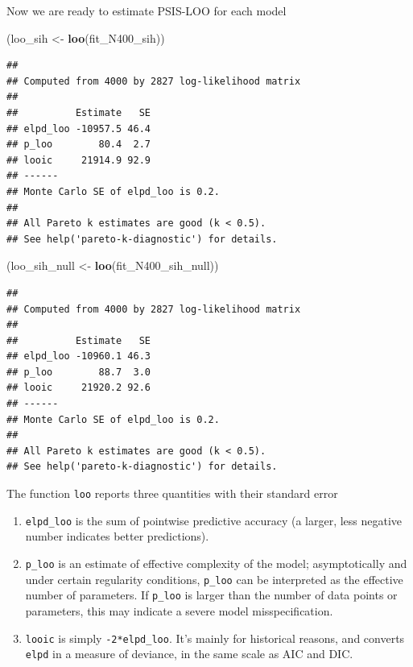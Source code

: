 \documentclass[12pt,]{krantz}
\newenvironment{Shaded}{\begin{snugshade}}{\end{snugshade}}
\newcommand{\KeywordTok}[1]{\textcolor[rgb]{0.13,0.29,0.53}{\textbf{#1}}}
\newcommand{\NormalTok}[1]{#1}
\newcommand{\StringTok}[1]{\textcolor[rgb]{0.31,0.60,0.02}{#1}}
\providecommand{\tightlist}{%
  \setlength{\itemsep}{0pt}\setlength{\parskip}{0pt}}
\theoremstyle{definition}
\theoremstyle{definition}
\theoremstyle{definition}
\theoremstyle{remark}
\begin{document}
Now we are ready to estimate PSIS-LOO for each model

\begin{Shaded}
\begin{Highlighting}[]
\NormalTok{(loo_sih <-}\StringTok{ }\KeywordTok{loo}\NormalTok{(fit_N400_sih))}
\end{Highlighting}
\end{Shaded}

\begin{verbatim}
## 
## Computed from 4000 by 2827 log-likelihood matrix
## 
##          Estimate   SE
## elpd_loo -10957.5 46.4
## p_loo        80.4  2.7
## looic     21914.9 92.9
## ------
## Monte Carlo SE of elpd_loo is 0.2.
## 
## All Pareto k estimates are good (k < 0.5).
## See help('pareto-k-diagnostic') for details.
\end{verbatim}

\begin{Shaded}
\begin{Highlighting}[]
\NormalTok{(loo_sih_null <-}\StringTok{ }\KeywordTok{loo}\NormalTok{(fit_N400_sih_null))}
\end{Highlighting}
\end{Shaded}

\begin{verbatim}
## 
## Computed from 4000 by 2827 log-likelihood matrix
## 
##          Estimate   SE
## elpd_loo -10960.1 46.3
## p_loo        88.7  3.0
## looic     21920.2 92.6
## ------
## Monte Carlo SE of elpd_loo is 0.2.
## 
## All Pareto k estimates are good (k < 0.5).
## See help('pareto-k-diagnostic') for details.
\end{verbatim}

The function \texttt{loo} reports three quantities with their standard error

\begin{enumerate}
\def\labelenumi{\arabic{enumi}.}
\tightlist
\item
  \texttt{elpd\_loo} is the sum of pointwise predictive accuracy (a larger, less negative number indicates better predictions).
\item
  \texttt{p\_loo} is an estimate of effective complexity of the model; asymptotically and under certain regularity conditions, \texttt{p\_loo} can be interpreted as the effective number of parameters. If \texttt{p\_loo} is larger than the number of data points or parameters, this may indicate a severe model misspecification.
\item
  \texttt{looic} is simply \texttt{-2*elpd\_loo}. It's mainly for historical reasons, and converts \texttt{elpd} in a measure of deviance, in the same scale as AIC and DIC.
\end{enumerate}
\end{document}

